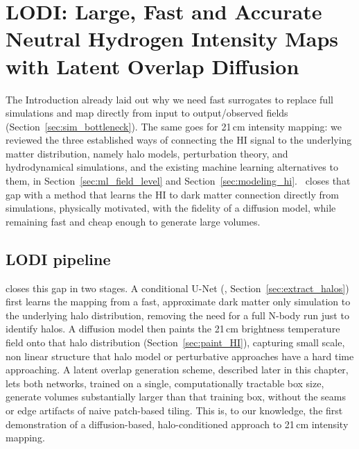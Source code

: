 \chapter{LODI: Large, Fast and Accurate Neutral Hydrogen Intensity Maps with Latent Overlap Diffusion}
\label{ch:lodi}
The Introduction already laid out why we need fast surrogates to replace full simulations and map directly from input to output/observed fields (Section~\ref{sec:sim_bottleneck}).
The same goes for 21\,cm intensity mapping: we reviewed the three established ways of connecting the HI signal to the underlying matter distribution, namely halo models, perturbation theory, and hydrodynamical simulations, and the existing machine learning alternatives to them, in Section~\ref{sec:ml_field_level} and Section~\ref{sec:modeling_hi}.
\LODI\ closes that gap with a method that learns the HI to dark matter connection directly from simulations, physically motivated, with the fidelity of a diffusion model, while remaining fast and cheap enough to generate large volumes.








\section{LODI pipeline}

\LODI closes this gap in two stages. A conditional U-Net (\HALOgen,
Section~\ref{sec:extract_halos}) first learns the mapping from a fast,
approximate dark matter only simulation to the underlying halo distribution,
removing the need for a full N-body run just to identify halos. A diffusion
model then paints the 21\,cm brightness temperature field onto that halo
distribution (Section~\ref{sec:paint_HI}), capturing small scale, non linear
structure that halo model or perturbative approaches have a hard time approaching.
A latent overlap generation scheme, described later in this chapter, lets
both networks, trained on a single, computationally tractable box size,
generate volumes substantially larger than that training box, without the
seams or edge artifacts of naive patch-based tiling. This is, to our
knowledge, the first demonstration of a diffusion-based, halo-conditioned
approach to 21\,cm intensity mapping.

